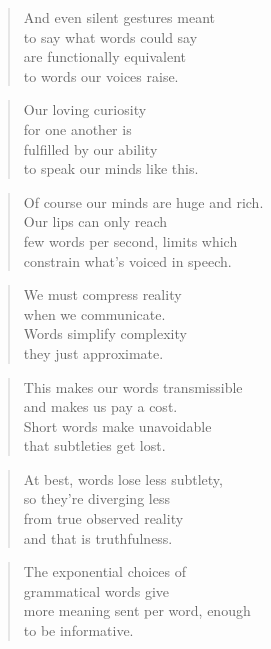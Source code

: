 \documentclass[10pt,a4paper]{article}
\begin{document}
\begin{multicols}{2}
\begin{verse}
And even silent gestures meant\\
to say what words could say\\
are functionally equivalent\\
to words our voices raise.
\end{verse}

\begin{verse}
Our loving curiosity\\
for one another is\\
fulfilled by our ability\\
to speak our minds like this.
\end{verse}

\begin{verse}
Of course our minds are huge and rich.\\
Our lips can only reach\\
few words per second, limits which\\
constrain what’s voiced in speech.
\end{verse}

\begin{verse}
We must compress reality\\
when we communicate.\\
Words simplify complexity\\
they just approximate.
\end{verse}

\begin{verse}
This makes our words transmissible\\
and makes us pay a cost.\\
Short words make unavoidable\\
that subtleties get lost.
\end{verse}

\begin{verse}
At best, words lose less subtlety,\\
so they’re diverging less\\
from true observed reality\\
and that is truthfulness.
\end{verse}

\begin{verse}
The exponential choices of\\
grammatical words give\\
more meaning sent per word, enough\\
to be informative.
\end{verse}


\end{multicols}
\end{document}
